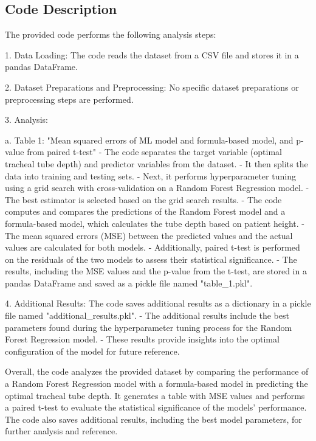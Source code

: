 \documentclass[11pt]{article}
\begin{document}
\subsection{Code Description}

The provided code performs the following analysis steps:

1. Data Loading: The code reads the dataset from a CSV file and stores it in a pandas DataFrame.

2. Dataset Preparations and Preprocessing: No specific dataset preparations or preprocessing steps are performed.

3. Analysis:

   a. Table 1: "Mean squared errors of ML model and formula-based model, and p-value from paired t-test"
      - The code separates the target variable (optimal tracheal tube depth) and predictor variables from the dataset.
      - It then splits the data into training and testing sets.
      - Next, it performs hyperparameter tuning using a grid search with cross-validation on a Random Forest Regression model.
      - The best estimator is selected based on the grid search results.
      - The code computes and compares the predictions of the Random Forest model and a formula-based model, which calculates the tube depth based on patient height.
      - The mean squared errors (MSE) between the predicted values and the actual values are calculated for both models.
      - Additionally, paired t-test is performed on the residuals of the two models to assess their statistical significance.
      - The results, including the MSE values and the p-value from the t-test, are stored in a pandas DataFrame and saved as a pickle file named "table\_1.pkl".
   
4. Additional Results: The code saves additional results as a dictionary in a pickle file named "additional\_results.pkl".
   - The additional results include the best parameters found during the hyperparameter tuning process for the Random Forest Regression model.
   - These results provide insights into the optimal configuration of the model for future reference.

Overall, the code analyzes the provided dataset by comparing the performance of a Random Forest Regression model with a formula-based model in predicting the optimal tracheal tube depth. It generates a table with MSE values and performs a paired t-test to evaluate the statistical significance of the models' performance. The code also saves additional results, including the best model parameters, for further analysis and reference.
\end{document}
